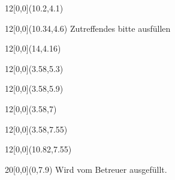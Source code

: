 \begin{titlepage}
    \begin{textblock}{12}[0,0](10.2,4.1)
    \end{textblock}

    \begin{textblock}{12}[0,0](10.34,4.6)
        \scriptsize Zutreffendes bitte ausfüllen
    \end{textblock}

    \begin{textblock}{12}[0,0](14,4.16)
        \huge\textbf{\semester}
    \end{textblock}

    \begin{textblock}{12}[0,0](3.58,5.3)
    \end{textblock}

    \begin{textblock}{12}[0,0](3.58,5.9)
    \end{textblock}

    \begin{textblock}{12}[0,0](3.58,7)
    \end{textblock}

    \begin{textblock}{12}[0,0](3.58,7.55)
    \end{textblock}
    \begin{textblock}{12}[0,0](10.82,7.55)
    \end{textblock}

    \begin{textblock}{20}[0,0](0,7.9)\tiny\centering
        Wird vom Betreuer ausgefüllt.
    \end{textblock}


\end{titlepage}
